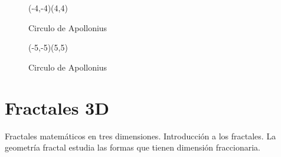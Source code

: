 \documentclass[a4paper]{book}
\begin{document}
\begin{figure}[!ht]
	\begin{center}
		\begin{pspicture}[showgrid=true,linewidth=9pt](-4,-4)(4,4)
			\psAppolonius[Radius=4cm]
		\end{pspicture}
	\end{center}
	\caption{Circulo de Apollonius}
\end{figure}

\begin{figure}[!ht]
	\begin{center}
		\begin{pspicture}[showgrid=true,linewidth=9pt](-5,-5)(5,5)
			\psAppolonius[Radius=5cm,Color]
		\end{pspicture}
	\end{center}
	\caption{Circulo de Apollonius}
\end{figure}




\section{Fractales 3D}


Fractales matemáticos en tres dimensiones. Introducción a los fractales. La geometría fractal estudia las formas que tienen dimensión fraccionaria.
\end{document}
